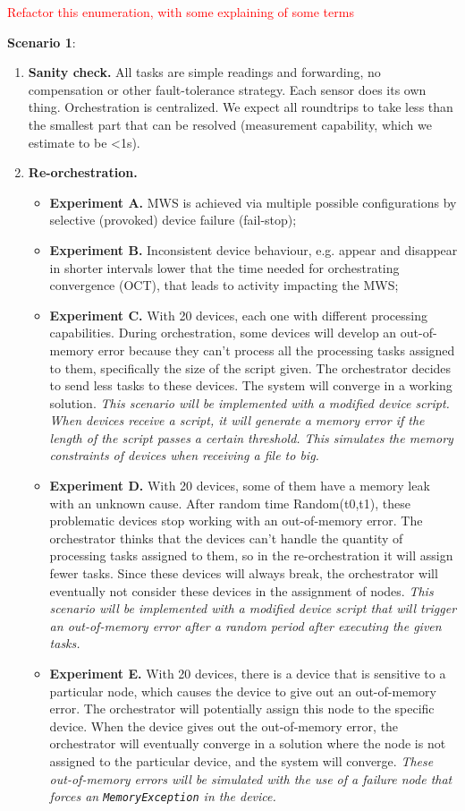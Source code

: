 \textcolor{red}{Refactor this enumeration, with some explaining of some terms}

\textbf{Scenario 1}:
\begin{enumerate}
    \item \textbf{Sanity check.} All tasks are simple readings and forwarding, no compensation or other fault-tolerance strategy. Each sensor does its own thing. Orchestration is centralized. We expect all roundtrips to take less than the smallest part that can be resolved (measurement capability, which we estimate to be <1s).
    \item \textbf{Re-orchestration.}
        \begin{itemize}
            \item \textbf{Experiment A.} MWS is achieved via multiple possible configurations by selective (provoked) device failure (fail-stop);
            \item \textbf{Experiment B.} Inconsistent device behaviour, e.g. appear and disappear in shorter intervals lower that the time needed for orchestrating convergence (OCT), that leads to activity impacting the MWS;
            \item \textbf{Experiment C.} With 20 devices, each one with different processing capabilities. During orchestration, some devices will develop an out-of-memory error because they can't process all the processing tasks assigned to them, specifically the size of the script given. The orchestrator decides to send less tasks to these devices. The system will converge in a working solution. \textit{This scenario will be implemented with a modified device script. When devices receive a script, it will generate a memory error if the length of the script passes a certain threshold. This simulates the memory constraints of devices when receiving a file to big.}
            \item \textbf{Experiment D.} With 20 devices, some of them have a memory leak with an unknown cause. After random time Random(t0,t1), these problematic devices stop working with an out-of-memory error. The orchestrator thinks that the devices can't handle the quantity of processing tasks assigned to them, so in the re-orchestration it will assign fewer tasks. Since these devices will always break, the orchestrator will eventually not consider these devices in the assignment of nodes. \textit{This scenario will be implemented with a modified device script that will trigger an out-of-memory error after a random period after executing the given tasks.}
            \item \textbf{Experiment E.} With 20 devices, there is a device that is sensitive to a particular node, which causes the device to give out an out-of-memory error. The orchestrator will potentially assign this node to the specific device. When the device gives out the out-of-memory error, the orchestrator will eventually converge in a solution where the node is not assigned to the particular device, and the system will converge.  \textit{These out-of-memory errors will be simulated with the use of a failure node that forces an \texttt{MemoryException} in the device.}

\end{itemize}
\end{enumerate}
